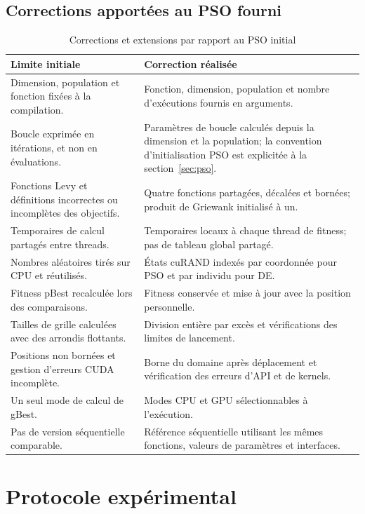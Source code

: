 \documentclass[conference]{IEEEtran}
\begin{document}
\subsection{Corrections apportées au PSO fourni}
\label{sec:corrections}

\begin{table}[t]
\centering
\caption{Corrections et extensions par rapport au PSO initial}
\label{tab:corrections}
\begin{tabular}{p{}p{}}
\toprule
\textbf{Limite initiale} & \textbf{Correction réalisée}\\
\midrule
Dimension, population et fonction fixées à la compilation.
& Fonction, dimension, population et nombre d'exécutions fournis en arguments.\\
Boucle exprimée en itérations, et non en évaluations.
& Paramètres de boucle calculés depuis la dimension et la population; la
convention d'initialisation PSO est explicitée à la section~\ref{sec:pso}.\\
Fonctions Levy et définitions incorrectes ou incomplètes des objectifs.
& Quatre fonctions partagées, décalées et bornées; produit de Griewank initialisé à un.\\
Temporaires de calcul partagés entre threads.
& Temporaires locaux à chaque thread de fitness; pas de tableau global partagé.\\
Nombres aléatoires tirés sur CPU et réutilisés.
& États cuRAND indexés par coordonnée pour PSO et par individu pour DE.\\
Fitness pBest recalculée lors des comparaisons.
& Fitness conservée et mise à jour avec la position personnelle.\\
Tailles de grille calculées avec des arrondis flottants.
& Division entière par excès et vérifications des limites de lancement.\\
Positions non bornées et gestion d'erreurs CUDA incomplète.
& Borne du domaine après déplacement et vérification des erreurs d'API et de kernels.\\
Un seul mode de calcul de gBest.
& Modes CPU et GPU sélectionnables à l'exécution.\\
Pas de version séquentielle comparable.
& Référence séquentielle utilisant les mêmes fonctions, valeurs de paramètres et interfaces.\\
\bottomrule
\end{tabular}
\end{table}

\section{Protocole expérimental}
\label{sec:setup}
\end{document}
